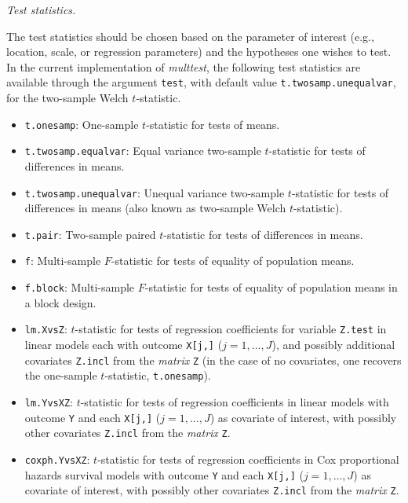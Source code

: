 \documentclass[11pt]{article}
\newcommand{\Rpackage}[1]{\textit{#1}}
\newcommand{\Robject}[1]{\texttt{#1}}
\newcommand{\Rclass}[1]{\textit{#1}}
\begin{document}
\begin{description}
\item{\em Test statistics.} 

The test statistics should be chosen based on the parameter of interest (e.g., location, scale, or regression parameters) and the hypotheses one wishes to test. In the current implementation of \Rpackage{multtest}, the following test statistics are available through the argument \Robject{test}, with default value \Robject{t.twosamp.unequalvar}, for the two-sample Welch $t$-statistic. 
\begin{itemize}
\item 
\Robject{t.onesamp}: One-sample $t$-statistic for tests of means.
\item 
\Robject{t.twosamp.equalvar}: Equal variance two-sample $t$-statistic for tests of differences in means.
\item 
\Robject{t.twosamp.unequalvar}: Unequal variance two-sample $t$-statistic for tests of differences in means (also known as two-sample Welch $t$-statistic). 
\item 
\Robject{t.pair}: Two-sample paired $t$-statistic for tests of differences in means.
\item 
\Robject{f}: Multi-sample $F$-statistic for tests of equality of population means.
\item 
\Robject{f.block}: Multi-sample $F$-statistic for tests of equality of population means in a block design.
\item 

\Robject{lm.XvsZ}: 
$t$-statistic for tests of regression coefficients for variable \Robject{Z.test} in linear models each with outcome \Robject{X[j,]} ($j=1,\ldots,J$), and possibly additional covariates \Robject{Z.incl} from the \Rclass{matrix} \Robject{Z} (in the case of no covariates, one recovers the one-sample $t$-statistic, \Robject{t.onesamp}).
\item 
\Robject{lm.YvsXZ}: 
$t$-statistic for tests of regression coefficients in linear models with outcome \Robject{Y} and each \Robject{X[j,]} ($j=1,\ldots,J$) as covariate of interest, with possibly other covariates \Robject{Z.incl} from the \Rclass{matrix} \Robject{Z}.
\item 
\Robject{coxph.YvsXZ}: $t$-statistic for tests of regression coefficients in Cox proportional hazards survival models with outcome \Robject{Y} and each \Robject{X[j,]} ($j=1,\ldots,J$) as covariate of interest, with possibly other covariates \Robject{Z.incl} from the \Rclass{matrix} \Robject{Z}.
\end{itemize}



\end{description}
\end{document}
